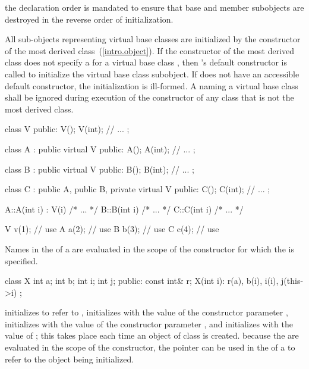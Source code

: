 \enternote
the declaration order is mandated to ensure that base and member
subobjects are destroyed in the reverse order of initialization.
\exitnote

\pnum
All sub-objects representing virtual base classes are initialized by the
constructor of the most derived class~(\ref{intro.object}). If the
constructor of the most derived class does not specify a
 for a virtual base class , then
's default constructor is called to initialize the virtual base
class subobject. If  does not have an accessible default
constructor, the initialization is ill-formed. A 
naming a virtual base class shall be ignored during execution of the
constructor of any class that is not the most derived class.
\enterexample
\begin{codeblock}
class V {
public:
    V();
    V(int);
    // ...
};

class A : public virtual V {
public:
    A();
    A(int);
    // ...
};

class B : public virtual V {
public:
    B();
    B(int);
    // ...
};

class C : public A, public B, private virtual V {
public:
    C();
    C(int);
    // ...
};

A::A(int i) : V(i) { /* ... */ }
B::B(int i) { /* ... */ }
C::C(int i) { /* ... */ }

V v(1);				// use 
A a(2);				// use 
B b(3);				// use 
C c(4);				// use 
\end{codeblock}
\exitexampleb

\pnum
{}%
Names in the
of a
are evaluated in the scope of the constructor for which the
is specified.
\enterexample

\begin{codeblock}
class X {
    int a;
    int b;
    int i;
    int j;
public:
    const int& r;
    X(int i): r(a), b(i), i(i), j(this->i) {}
};
\end{codeblock}

initializes
to refer to
,
initializes
with the value of the constructor parameter
,
initializes
with the value of the constructor parameter
,
and initializes
with the value of
;
this takes place each time an object of class
is created.
\exitexample
\enternote
because the
are evaluated in the scope of the constructor, the
pointer can be used in the
of a
to refer to the object being initialized.
\exitnote

